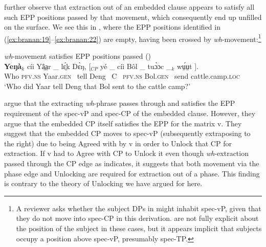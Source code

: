\documentclass[output=paper,colorlinks,citecolor=brown]{langscibook}
\begin{document}
\z

\citeauthor{VanUrkRichards2015} further observe that extraction out of an embedded clause appears to satisfy all such EPP positions passed by that movement, which consequently end up unfilled on the surface. We see this in , where the EPP positions identified in (\ref{ex:branan:19}--\ref{ex:branan:22}) are empty, having been crossed by \textit{wh}-movement:\footnote{A reviewer asks whether the subject DPs in  might inhabit spec-vP, given that they do not move into spec-CP in this derivation. \citeauthor{VanUrkRichards2015} are not fully explicit about the position of the subject in these cases, but it appears implicit that subjects occupy a position above spec-vP, presumably spec-TP.}

\ea%
    \label{ex:branan:23}\textit{wh}-movement satisfies EPP positions passed (\citealt[ex. 37]{VanUrkRichards2015})\\
    \gll    \textbf{Yeŋ\`{a}}$_{k}$ c\'{i}i  Yâ̤a̤r \_ lɛ̤́k  D\`{ɛ}ŋ, [$_{CP}$ y\'{e} \_  c\'{i}i  B\^{o}l \_ tu\`{ɔ}ɔc \_$_{k}$ wṳ́ṳt ]. \\
            Who \textsc{pfv.ns}   Yaar.\textsc{gen} \,  tell Deng \, C \, \textsc{pfv.ns}  Bol.\textsc{gen} \, send {} cattle.camp.\textsc{loc}  \\
    \glt    `Who did Yaar tell Deng that Bol sent to the cattle camp?'
\z

\citeauthor{VanUrkRichards2015} argue that the extracting \textit{wh}-phrase passes through and satisfies the EPP requirement of the spec-vP and spec-CP of the embedded clause. However, they argue that the embedded CP itself satisfies the EPP for the matrix v. They suggest that the embedded CP moves to spec-vP (subsequently extraposing to the right) due to being Agreed with by v in order to Unlock that CP for extraction. If v had to Agree with CP to Unlock it even though \textit{wh}-extraction passed through the CP edge as  indicates, it suggests that both movement via the phase edge and Unlocking are required for extraction out of a phase. This finding is contrary to the theory of Unlocking we have argued for here.
\end{document}
